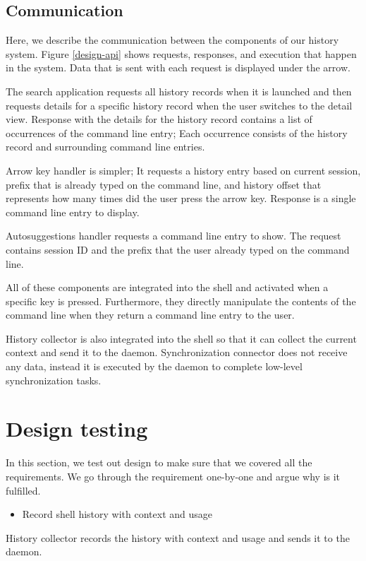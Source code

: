 \subsection{Communication}

Here, we describe the communication between the components of our history system. Figure \ref{design-api} shows requests, responses, and execution that happen in the system. Data that is sent with each request is displayed under the arrow. 

The search application requests all history records when it is launched and then requests details for a specific history record when the user switches to the detail view. Response with the details for the history record contains a list of occurrences of the command line entry; Each occurrence consists of the history record and surrounding command line entries.

Arrow key handler is simpler; It requests a history entry based on current session, prefix that is already typed on the command line, and history offset that represents how many times did the user press the arrow key. Response is a single command line entry to display.

Autosuggestions handler requests a command line entry to show. The request contains session ID and the prefix that the user already typed on the command line.

All of these components are integrated into the shell and activated when a specific key is pressed. Furthermore, they directly manipulate the contents of the command line when they return a command line entry to the user.

History collector is also integrated into the shell so that it can collect the current context and send it to the daemon. Synchronization connector does not receive any data, instead it is executed by the daemon to complete low-level synchronization tasks. 

\section{Design testing}

In this section, we test out design to make sure that we covered all the requirements. We go through the requirement one-by-one and argue why is it fulfilled. 
\begin{itemize}
    \item Record shell history with context and usage
\end{itemize}
History collector records the history with context and usage and sends it to the daemon.

